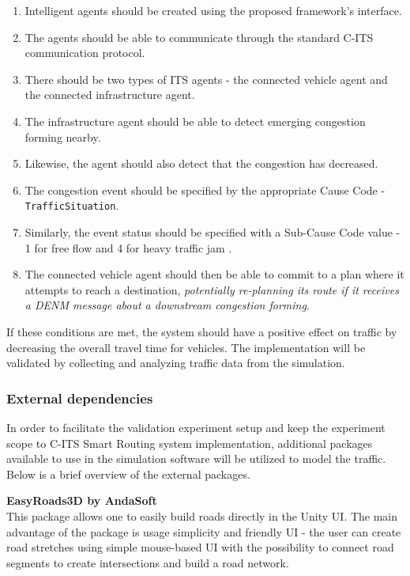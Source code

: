 \documentclass[main.tex]{subfiles}
\begin{document}
\begin{enumerate}
    \item Intelligent agents should be created using the proposed framework's interface.
    \item The agents should be able to communicate through the standard C-ITS communication protocol.
    \item There should be two types of ITS agents - the connected vehicle agent and the connected infrastructure agent.
    \item The infrastructure agent should be able to detect emerging congestion forming nearby.
    \item Likewise, the agent should also detect that the congestion has decreased.
    \item The congestion event should be specified by the appropriate Cause Code - \texttt{TrafficSituation}.
    \item Similarly, the event status should be specified with a Sub-Cause Code value - 1 for
    free flow and 4 for heavy traffic jam \cite{ETSI2019}. 
    \item The connected vehicle agent should then be able to commit to a plan where it attempts to reach a
    destination, \emph{potentially re-planning its route if it receives a DENM message about a downstream congestion forming}.
 \end{enumerate}

If these conditions are met, the system should have a positive effect on traffic by decreasing the overall 
travel time for vehicles. The implementation will be validated by collecting and analyzing traffic data from 
the simulation.

\subsubsection{External dependencies}

In order to facilitate the validation experiment setup and keep the experiment scope to C-ITS
Smart Routing system implementation, additional packages available to use in the simulation
software will be utilized to model the traffic. Below is a brief overview of the external packages.

\textbf{EasyRoads3D by AndaSoft} \smallskip \\
This package allows one to easily build roads directly in the Unity UI. The main advantage of the 
package is usage simplicity and friendly UI - the user can create road stretches using simple
mouse-based UI with the possibility to connect road segments to create intersections
and build a road network.
\end{document}
